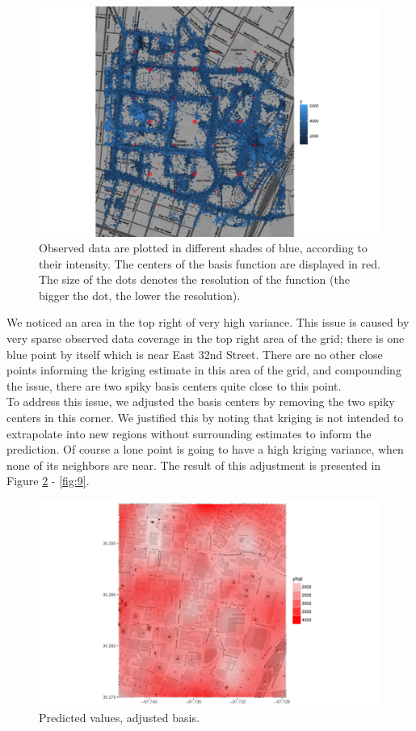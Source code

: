 \documentclass[11pt]{article}
\begin{document}
\begin{figure}[H]
\centering
\includegraphics[width=0.8\columnwidth]{Images/data_grid}
\caption{Observed data are plotted in different shades of blue, according to their intensity. The centers of the basis function are displayed in red. The size of the dots denotes the resolution of the function (the bigger the dot, the lower the resolution).}
\label{fig:6}
\end{figure}

We noticed an area in the top right of very high variance.  This issue is caused by very sparse observed data coverage in the top right area of the grid; there is one blue point by itself which is near East 32nd Street.  There are no other close points informing the kriging estimate in this area of the grid, and compounding the issue, there are two spiky basis centers quite close to this point. \\

To address this issue, we adjusted the basis centers by removing the two spiky centers in this corner.  We justified this by noting that kriging is not intended to extrapolate into new regions without surrounding estimates to inform the prediction.  Of course a lone point is going to have a high kriging variance, when none of its neighbors are near. The result of this adjustment is presented in Figure \ref{fig:7} - \ref{fig:9}.

\begin{figure}[H]
\centering
\includegraphics[width=0.8\columnwidth]{Images/pred_newgrid_origscale.pdf}
\caption{Predicted values, adjusted basis.}
\label{fig:7}
\end{figure}
\end{document}
